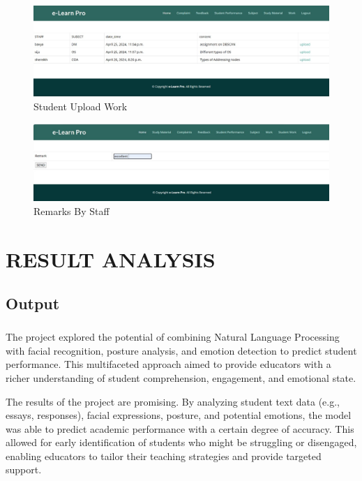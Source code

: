 \begin{figure}[!ht]
\centering
\includegraphics[width=125mm]{student uplooad .png}
\caption{Student Upload Work}
\end{figure} 


\begin{figure}[!ht]
\centering
\includegraphics[width=125mm]{remarks by staff.png}
\caption{Remarks By Staff}
\end{figure} 




\chapter[RESULT ANALYSIS]{\fontsize{16}{12}\vspace{-.59in}\selectfont RESULT ANALYSIS}

\section{Output}

\paragraph{} The project explored the potential of combining Natural Language Processing with facial recognition, posture analysis, and emotion detection to predict student performance. This multifaceted approach aimed to provide educators with a richer understanding of student comprehension, engagement, and emotional state. 

The results of the project are promising. By analyzing student text data (e.g., essays, responses), facial expressions, posture, and potential emotions, the model was able to predict academic performance with a certain degree of accuracy. This allowed for early identification of students who might be struggling or disengaged, enabling educators to tailor their teaching strategies and provide targeted support. 


